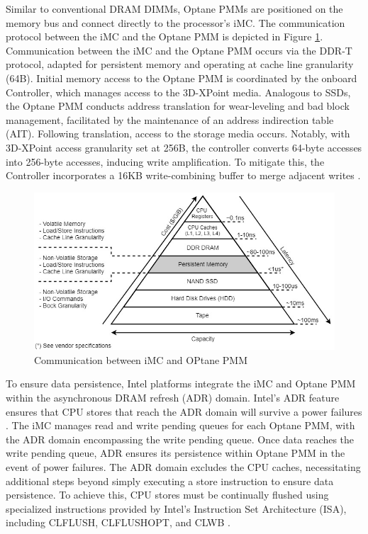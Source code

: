 Similar to conventional DRAM DIMMs, Optane PMMs are positioned on the memory bus and connect directly to the processor's iMC. The communication protocol between the iMC and the Optane PMM is depicted in Figure \ref{fig:optane_communication}.  Communication between the iMC and the Optane PMM occurs via the DDR-T protocol, adapted for persistent memory and operating at cache line granularity (64B). Initial memory access to the Optane PMM is coordinated by the onboard Controller, which manages access to the 3D-XPoint media. Analogous to SSDs, the Optane PMM conducts address translation for wear-leveling and bad block management, facilitated by the maintenance of an address indirection table (AIT). Following translation, access to the storage media occurs. Notably, with 3D-XPoint access granularity set at 256B, the controller converts 64-byte accesses into 256-byte accesses, inducing write amplification. To mitigate this, the Controller incorporates a 16KB write-combining buffer to merge adjacent writes \cite{yang2020empirical,izraelevitz2019basic,wu2020ribbon}.

\begin{figure}[ht]
    \centering
    \includegraphics[scale=0.5]{images/pmem_storage_pyramid.jpg}
    \caption{Communication between iMC and OPtane PMM}
    \label{fig:optane_communication}
\end{figure}

To ensure data persistence, Intel platforms integrate the iMC and Optane PMM within the asynchronous DRAM refresh (ADR) domain. Intel's ADR feature ensures that CPU stores that reach the ADR domain will survive a power failures \cite{yang2020empirical}. The iMC manages read and write pending queues for each Optane PMM, with the ADR domain encompassing the write pending queue. Once data reaches the write pending queue, ADR ensures its persistence within Optane PMM in the event of power failures. The ADR domain excludes the CPU caches, necessitating additional steps beyond simply executing a store instruction to ensure data persistence. To achieve this, CPU stores must be continually flushed using specialized instructions provided by Intel's Instruction Set Architecture (ISA), including \textrm{CLFLUSH}, \textrm{CLFLUSHOPT}, and \textrm{CLWB} \cite{yang2020empirical,izraelevitz2019basic,rudoff2017persistent}.

